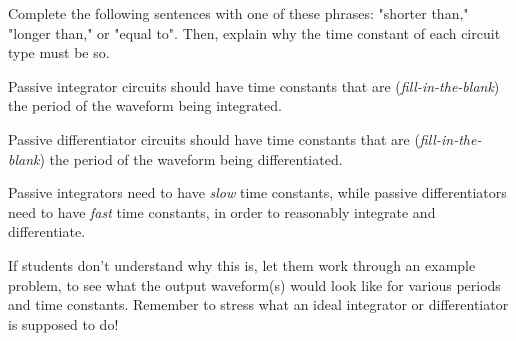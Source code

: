 

Complete the following sentences with one of these phrases: "shorter than," "longer than," or "equal to".  Then, explain why the time constant of each circuit type must be so.

\vskip 10pt {\narrower \noindent \baselineskip5pt

Passive integrator circuits should have time constants that are ({\it fill-in-the-blank}) the period of the waveform being integrated.

\par}


\vskip 10pt {\narrower \noindent \baselineskip5pt

Passive differentiator circuits should have time constants that are ({\it fill-in-the-blank}) the period of the waveform being differentiated.

\par} 







Passive integrators need to have {\it slow} time constants, while passive differentiators need to have {\it fast} time constants, in order to reasonably integrate and differentiate.







If students don't understand why this is, let them work through an example problem, to see what the output waveform(s) would look like for various periods and time constants.  Remember to stress what an ideal integrator or differentiator is supposed to do!




